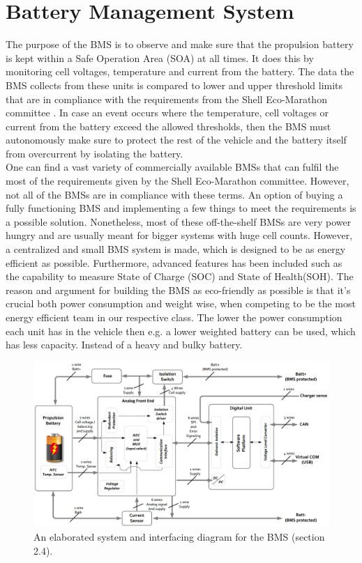 \newpage
\section{Battery Management System}
\label{sec:BMSHWChapter}
The purpose of the BMS is to observe and make sure that the propulsion battery is kept within a Safe Operation Area (SOA) at all times. It does this by monitoring cell voltages, temperature and current from the battery. The data the BMS collects from these units is compared to lower and upper threshold limits that are in compliance with the requirements from the Shell Eco-Marathon committee \cite{ShellRequirements}. In case an event occurs where the temperature, cell voltages or current from the battery exceed the allowed thresholds, then the BMS must autonomously make sure to protect the rest of the vehicle and the battery itself from overcurrent by isolating the battery. \\
One can find a vast variety of commercially available BMSs that can fulfil the most of the requirements given by the Shell Eco-Marathon committee. However, not all of the BMSs are in compliance with these terms. An option of buying a fully functioning BMS and implementing a few things to meet the requirements is a possible solution. Nonetheless, most of these off-the-shelf BMSs are very power hungry and are usually meant for bigger systems with huge cell counts. However, a centralized and small BMS system is made, which is designed to be as energy efficient as possible. Furthermore, advanced features has been included such as the capability to measure State of Charge (SOC) and State of Health(SOH). The reason and argument for building the BMS as eco-friendly as possible is that it's crucial both power consumption and weight wise, when competing to be the most energy efficient team in our respective class. The lower the power consumption each unit has in the vehicle then e.g. a lower weighted battery can be used, which has less capacity. Instead of a heavy and bulky battery.\\

\begin{figure}[H]
	\centering
	\includegraphics[width=1.0\linewidth]{Hardware/Pictures/BMSOverview}
	\caption[Empty]{An elaborated system and interfacing diagram for the BMS \cite{BMSDocumentation} (section 2.4).}
	\label{fig:BMSOverview}
\end{figure}

